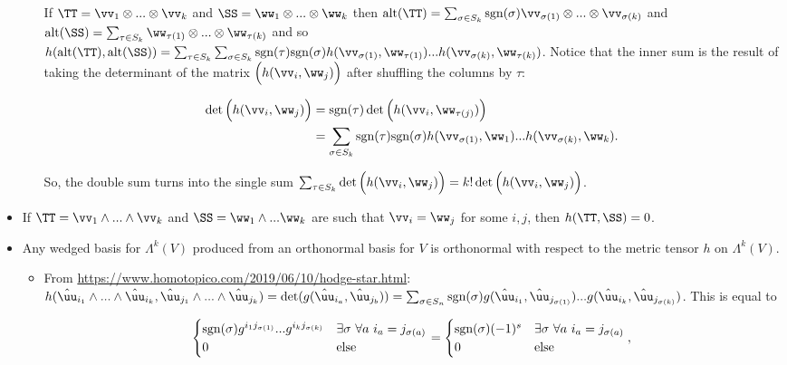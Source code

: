\documentclass{article}
\begin{document}
\begin{itemize}
\begin{itemize}
        If $\TT = \vv_1 \otimes ... \otimes \vv_k$ and $\SS = \ww_1 \otimes ... \otimes \ww_k$ then $\alt(\TT) = \sum_{\sigma \in S_k} \sgn(\sigma) \vv_{\sigma(1)} \otimes ... \otimes \vv_{\sigma(k)}$ and $\alt(\SS) = \sum_{\tau \in S_k} \ww_{\tau(1)} \otimes ... \otimes \ww_{\tau(k)}$ and so $h(\alt(\TT), \alt(\SS)) = \sum_{\tau \in S_k} \sum_{\sigma \in S_k} \sgn(\tau) \sgn(\sigma) h(\vv_{\sigma(1)}, \ww_{\tau(1)}) ... h(\vv_{\sigma(k)}, \ww_{\tau(k)})$. Notice that the inner sum is the result of taking the determinant of the matrix $\Big( h(\vv_i, \ww_j) \Big)$ after shuffling the columns by $\tau$:
        
        \begin{align*}
            \det\Big( h(\vv_i, \ww_j) \Big) &= \sgn(\tau) \det\Big( h(\vv_i, \ww_{\tau(j)}) \Big) \\
            &= \sum_{\sigma \in S_k} \sgn(\tau) \sgn(\sigma) h(\vv_{\sigma(1)}, \ww_1) ... h(\vv_{\sigma(k)}, \ww_k).
        \end{align*}
        
        So, the double sum turns into the single sum $\sum_{\tau \in S_k} \det\Big( h(\vv_i, \ww_j) \Big) = k! \det\Big( h(\vv_i, \ww_j) \Big)$.
    \end{itemize}
     
    \item If $\TT = \vv_1 \wedge ... \wedge \vv_k$ and $\SS = \ww_1 \wedge ... \ww_k$ are such that $\vv_i = \ww_j$ for some $i, j$, then $h(\TT, \SS) = 0$.
    
    \item Any wedged basis for $\Lambda^k(V)$ produced from an orthonormal basis for $V$ is orthonormal with respect to the metric tensor $h$ on $\Lambda^k(V)$.
    \begin{itemize}
        \item From \url{https://www.homotopico.com/2019/06/10/hodge-star.html}: \\ $h(\huu_{i_1} \wedge ... \wedge \huu_{i_k}, \huu_{j_1} \wedge ... \wedge \huu_{j_k}) = \det(g(\huu_{i_a}, \huu_{j_b})) = \sum_{\sigma \in S_n} \text{sgn}(\sigma) g(\huu_{i_1}, \huu_{j_{\sigma(1)}}) ... g(\huu_{i_k}, \huu_{j_{\sigma(k)}})$. This is equal to
            
        \begin{align*}
            \begin{cases}
                \text{sgn}(\sigma) g^{i_1 j_{\sigma(1)}} ... g^{i_k j_{\sigma(k)}} & \exists \sigma \text{ } \forall a \text{ } i_a = j_{\sigma(a)} \\
                0 & \text{else}
            \end{cases}
            =
            \begin{cases}
                \text{sgn}(\sigma) (-1)^s & \exists \sigma \text{ } \forall a \text{ } i_a = j_{\sigma(a)} \\
                0 & \text{else}
            \end{cases},
        \end{align*}
        

\end{itemize}
\end{itemize}
\end{document}
